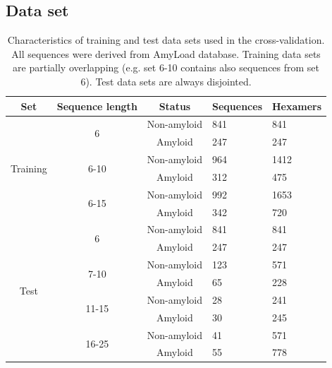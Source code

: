 \documentclass[fleqn,10pt,twoside]{gcb15submission}
\begin{document}
\subsection{Data set}

\begin{table}[h]
\centering
\small
\caption{Characteristics of training and test data sets used in the 
cross-validation. All sequences were derived from AmyLoad database. Training 
data sets are partially overlapping (e.g. set 6-10 contains also sequences 
from set 6). Test data sets are always disjointed.}
\label{tab:data_sets}
\begin{tabular}{cccll}
\toprule
Set & Sequence length & Status & Sequences & Hexamers \\ 
\midrule
\multirow{6}{*}{Training} & \multirow{2}{*}{6} & Non-amyloid & 841 & 841 
\\
 &  & \cellcolor[gray]{0.85}Amyloid & \cellcolor[gray]{0.85}247 & 
\cellcolor[gray]{0.85}247 \\
 \cline{2-5}
 & \multirow{2}{*}{6-10} & Non-amyloid & 964 & 1412 \\
 &  & \cellcolor[gray]{0.85}Amyloid & \cellcolor[gray]{0.85}312 & 
\cellcolor[gray]{0.85}475 \\
 \cline{2-5}
 & \multirow{2}{*}{6-15} & Non-amyloid & 992 & 1653 \\
 &  & \cellcolor[gray]{0.85}Amyloid & \cellcolor[gray]{0.85}342 & 
\cellcolor[gray]{0.85}720 \\
 \hline
 \hline
\multirow{8}{*}{Test} & \multirow{2}{*}{6} & Non-amyloid & 841 & 841 \\
 &  & \cellcolor[gray]{0.85}Amyloid & \cellcolor[gray]{0.85}247 & 
\cellcolor[gray]{0.85}247 \\
 \cline{2-5}
 & \multirow{2}{*}{7-10} & Non-amyloid & 123 & 571 \\
 &  & \cellcolor[gray]{0.85}Amyloid & \cellcolor[gray]{0.85}65 & 
\cellcolor[gray]{0.85}228 \\
 \cline{2-5}
 & \multirow{2}{*}{11-15} & Non-amyloid & 28 & 241 \\
 &  & \cellcolor[gray]{0.85}Amyloid & \cellcolor[gray]{0.85}30 & 
\cellcolor[gray]{0.85}245 \\
 \cline{2-5}
 & \multirow{2}{*}{16-25} & Non-amyloid & 41 & 571 \\
 &  & \cellcolor[gray]{0.85}Amyloid & \cellcolor[gray]{0.85}55 & 
\cellcolor[gray]{0.85}778 \\
 \bottomrule
\end{tabular}
\end{table}
\end{document}
